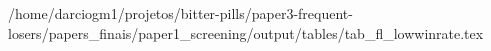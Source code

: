 /home/darciogm1/projetos/bitter-pills/paper3-frequent-losers/papers_finais/paper1_screening/output/tables/tab_fl_lowwinrate.tex
